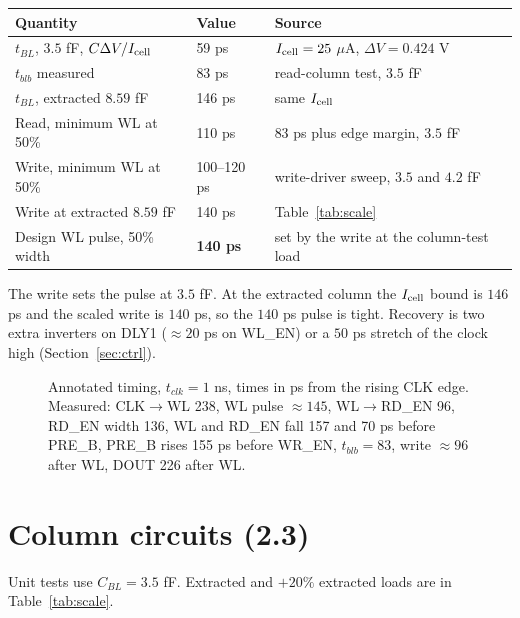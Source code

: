 \documentclass[10pt,letterpaper]{article}
\begin{document}
\begin{center}\small\begin{tabular}{lll}\toprule Quantity & Value & Source\\\midrule
$t_{BL}$, $3.5$ fF, $C\Delta V/I_{\rm cell}$ & 59 ps & $I_{\rm cell}=25$ $\mu$A, $\Delta V=0.424$ V\\
$t_{blb}$ measured & 83 ps & read-column test, $3.5$ fF\\
$t_{BL}$, extracted $8.59$ fF & 146 ps & same $I_{\rm cell}$\\
Read, minimum WL at 50\% & 110 ps & 83 ps plus edge margin, $3.5$ fF\\
Write, minimum WL at 50\% & 100--120 ps & write-driver sweep, $3.5$ and $4.2$ fF\\
Write at extracted $8.59$ fF & 140 ps & Table~\ref{tab:scale}\\
Design WL pulse, 50\% width & \textbf{140 ps} & set by the write at the column-test load\\\bottomrule\end{tabular}\end{center}
The write sets the pulse at $3.5$ fF. At the extracted column the $I_{\rm cell}$ bound is $146$ ps and the scaled write is $140$ ps, so the $140$ ps pulse is tight. Recovery is two extra inverters on DLY1 ($\approx20$ ps on WL\_EN) or a $50$ ps stretch of the clock high (Section~\ref{sec:ctrl}).
\begin{figure}[H]\centering\resizebox{\linewidth}{!}{}
\caption{Annotated timing, $t_{clk}=1$ ns, times in ps from the rising CLK edge. Measured: CLK$\to$WL 238, WL pulse $\approx145$, WL$\to$RD\_EN 96, RD\_EN width 136, WL and RD\_EN fall 157 and 70 ps before PRE\_B, PRE\_B rises 155 ps before WR\_EN, $t_{blb}=83$, write $\approx96$ after WL, DOUT 226 after WL.}\end{figure}

\section{Column circuits (2.3)}
Unit tests use $C_{BL}=3.5$ fF. Extracted and $+20\%$ extracted loads are in Table~\ref{tab:scale}.
\end{document}
